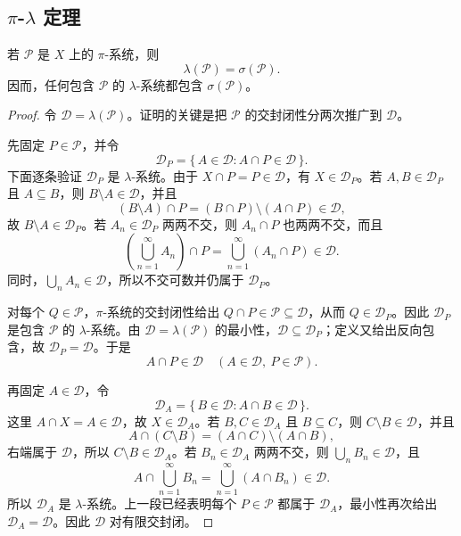 \subsection{\texorpdfstring{\(\pi\)}{\AnalysisPdfPi}-\texorpdfstring{\(\lambda\)}{\AnalysisPdfLambda} 定理}
\label{b1:subsec:010303}

\begin{theorem}[\(\pi\)--\(\lambda\)]
\label{b1:thm:pi-lambda}
若 \(\mathcal P\) 是 \(X\) 上的 \(\pi\)-系统，则
\[
\lambda(\mathcal P)=\sigma(\mathcal P).
\]
因而，任何包含 \(\mathcal P\) 的 \(\lambda\)-系统都包含 \(\sigma(\mathcal P)\)。
\end{theorem}
\begin{proof}
令 \(\mathcal D=\lambda(\mathcal P)\)。证明的关键是把 \(\mathcal P\) 的交封闭性分两次推广到 \(\mathcal D\)。

先固定 \(P\in\mathcal P\)，并令
\[
\mathcal D_P
=\{\,A\in\mathcal D:A\cap P\in\mathcal D\,\}.
\]
下面逐条验证 \(\mathcal D_P\) 是 \(\lambda\)-系统。由于 \(X\cap P=P\in\mathcal D\)，有 \(X\in\mathcal D_P\)。若 \(A,B\in\mathcal D_P\) 且 \(A\subseteq B\)，则 \(B\setminus A\in\mathcal D\)，并且
\[
(B\setminus A)\cap P
=(B\cap P)\setminus(A\cap P)\in\mathcal D,
\]
故 \(B\setminus A\in\mathcal D_P\)。若 \(A_n\in\mathcal D_P\) 两两不交，则 \(A_n\cap P\) 也两两不交，而且
\[
\left(\bigcup_{n=1}^{\infty}A_n\right)\cap P
=\bigcup_{n=1}^{\infty}(A_n\cap P)\in\mathcal D.
\]
同时，\(\bigcup_nA_n\in\mathcal D\)，所以不交可数并仍属于 \(\mathcal D_P\)。

对每个 \(Q\in\mathcal P\)，\(\pi\)-系统的交封闭性给出 \(Q\cap P\in\mathcal P\subseteq\mathcal D\)，从而 \(Q\in\mathcal D_P\)。因此 \(\mathcal D_P\) 是包含 \(\mathcal P\) 的 \(\lambda\)-系统。由 \(\mathcal D=\lambda(\mathcal P)\) 的最小性，\(\mathcal D\subseteq\mathcal D_P\)；定义又给出反向包含，故 \(\mathcal D_P=\mathcal D\)。于是
\[
A\cap P\in\mathcal D
\quad(A\in\mathcal D,\ P\in\mathcal P).
\]

再固定 \(A\in\mathcal D\)，令
\[
\mathcal D_A
=\{\,B\in\mathcal D:A\cap B\in\mathcal D\,\}.
\]
这里 \(A\cap X=A\in\mathcal D\)，故 \(X\in\mathcal D_A\)。若 \(B,C\in\mathcal D_A\) 且 \(B\subseteq C\)，则 \(C\setminus B\in\mathcal D\)，并且
\[
A\cap(C\setminus B)
=(A\cap C)\setminus(A\cap B),
\]
右端属于 \(\mathcal D\)，所以 \(C\setminus B\in\mathcal D_A\)。若 \(B_n\in\mathcal D_A\) 两两不交，则 \(\bigcup_nB_n\in\mathcal D\)，且
\[
A\cap\bigcup_{n=1}^{\infty}B_n
=\bigcup_{n=1}^{\infty}(A\cap B_n)\in\mathcal D.
\]
所以 \(\mathcal D_A\) 是 \(\lambda\)-系统。上一段已经表明每个 \(P\in\mathcal P\) 都属于 \(\mathcal D_A\)，最小性再次给出 \(\mathcal D_A=\mathcal D\)。因此 \(\mathcal D\) 对有限交封闭。


\end{proof}

